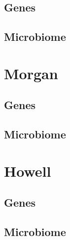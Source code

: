 \documentclass[
  a4paper,
]{book}
\begin{document}
\hypertarget{genes-1}{%
\subsection{Genes}\label{genes-1}}

\hypertarget{microbiome-3}{%
\subsection{Microbiome}\label{microbiome-3}}

\hypertarget{morgan}{%
\section{Morgan}\label{morgan}}

\hypertarget{genes-2}{%
\subsection{Genes}\label{genes-2}}

\hypertarget{microbiome-4}{%
\subsection{Microbiome}\label{microbiome-4}}

\hypertarget{howell}{%
\section{Howell}\label{howell}}

\hypertarget{genes-3}{%
\subsection{Genes}\label{genes-3}}

\hypertarget{microbiome-5}{%
\subsection{Microbiome}\label{microbiome-5}}
\end{document}
